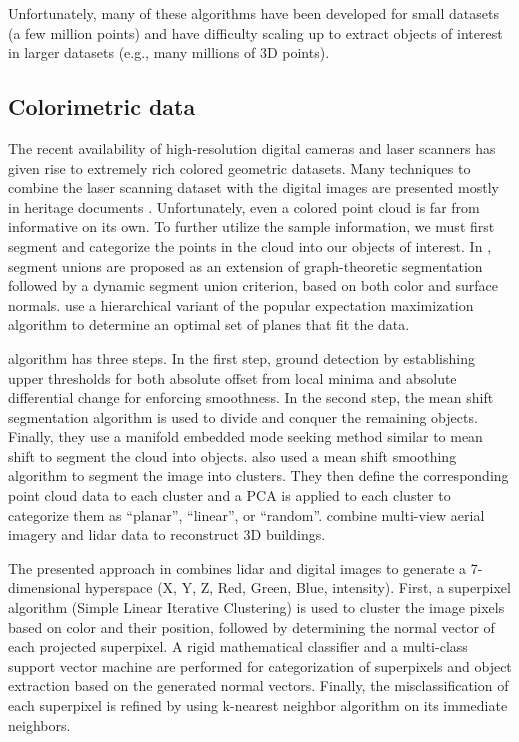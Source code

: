 \documentclass[final,3p,times,twocolumn,authoryear]{elsarticle}
\begin{document}
Unfortunately, many of these algorithms have been developed for small datasets (a few million points) and have difficulty scaling up to extract objects of interest in larger datasets (e.g., many millions of 3D points).

\subsection{Colorimetric data}
The recent availability of high-resolution digital cameras and laser scanners has given rise to extremely rich colored geometric datasets. Many techniques to combine the laser scanning dataset with the digital images are presented mostly in heritage documents \cite{douillard2011,caroti2006,kadobayashi2004}. Unfortunately, even a colored point cloud is far from informative on its own. To further utilize the sample information, we must first segment and categorize the points in the cloud into our objects of interest. In \cite{strom2010}, segment unions are proposed as an extension of graph-theoretic segmentation followed by a dynamic segment union criterion, based on both color and surface normals. \cite{triebel2005} use a hierarchical variant of the popular expectation maximization algorithm to determine an optimal set of planes that fit the data. 

\cite{yu2011} algorithm has three steps. In the first step, ground detection by establishing upper thresholds for both absolute offset from local minima and absolute differential change for enforcing smoothness. In the second step, the mean shift segmentation algorithm is used to divide and conquer the remaining objects. Finally, they use a manifold embedded mode seeking method similar to mean shift to segment the cloud into objects. \cite{sok2010} also used a mean shift smoothing algorithm to segment the image into clusters. They then define the corresponding point cloud data to each cluster and a PCA is applied to each cluster to categorize them as “planar”, “linear”, or “random”. \cite{cheng2011} combine multi-view aerial imagery and lidar data to reconstruct 3D buildings.  

The presented approach in \cite{superpixel} combines lidar and digital images to generate a 7-dimensional hyperspace (X, Y, Z, Red, Green, Blue, intensity). First, a superpixel algorithm (Simple Linear Iterative Clustering) is used to cluster the image pixels based on color and their position, followed by determining the normal vector of each projected superpixel. A rigid mathematical classifier and a multi-class support vector machine are performed for categorization of superpixels and object extraction based on the generated normal vectors. Finally, the misclassification of each superpixel is refined by using k-nearest neighbor algorithm on its immediate neighbors.
\end{document}
